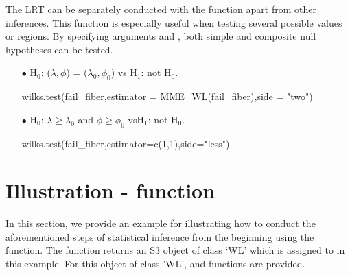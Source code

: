 The LRT can be separately conducted with the  function apart from other inferences. This function is especially useful when testing several possible values or regions. By specifying arguments  and , both simple and composite null hypotheses can be tested.   
\begin{itemize}
	\item[$\bullet$] H$_{0}$: ($\lambda,\phi$) = ($\lambda_{0},\phi_{0}$) \quad vs \quad H$_{1}$: not H$_{0}$.
	\begin{example}
wilks.test(fail_fiber,estimator = MME_WL(fail_fiber),side = "two")
	\end{example}
	
	\item[$\bullet$] H$_{0}$: $\lambda\geq \lambda_{0}$ and
	$\phi\geq\phi_{0}$ \quad vs\quad H$_{1}$: not H$_{0}$. 
	\begin{example}
wilks.test(fail_fiber,estimator=c(1,1),side="less")
	\end{example}
\end{itemize}





\section{Illustration -  function}
In this section, we provide an example for illustrating how to conduct the aforementioned steps of statistical inference from the beginning using the  function. The  function returns an S3 object of class `WL' which is assigned to  in this example. For this object of class 'WL',  and  functions are provided.

